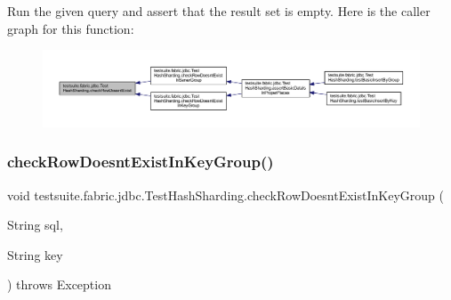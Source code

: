 Run the given query and assert that the result set is empty. Here is the caller graph for this function\+:
\nopagebreak
\begin{figure}[H]
\begin{center}
\leavevmode
\includegraphics[width=350pt]{classtestsuite_1_1fabric_1_1jdbc_1_1_test_hash_sharding_ae116d36f4a6b60e7a5e0faf1f7a7774f_icgraph}
\end{center}
\end{figure}
\mbox{\label{classtestsuite_1_1fabric_1_1jdbc_1_1_test_hash_sharding_aa64b14c5407a2f6c4128fa8bf3f27b6f}} 
\subsubsection{\texorpdfstring{check\+Row\+Doesnt\+Exist\+In\+Key\+Group()}{checkRowDoesntExistInKeyGroup()}}
{\footnotesize\ttfamily void testsuite.\+fabric.\+jdbc.\+Test\+Hash\+Sharding.\+check\+Row\+Doesnt\+Exist\+In\+Key\+Group (\begin{DoxyParamCaption}\item[{String}]{sql,  }\item[{String}]{key }\end{DoxyParamCaption}) throws Exception}

